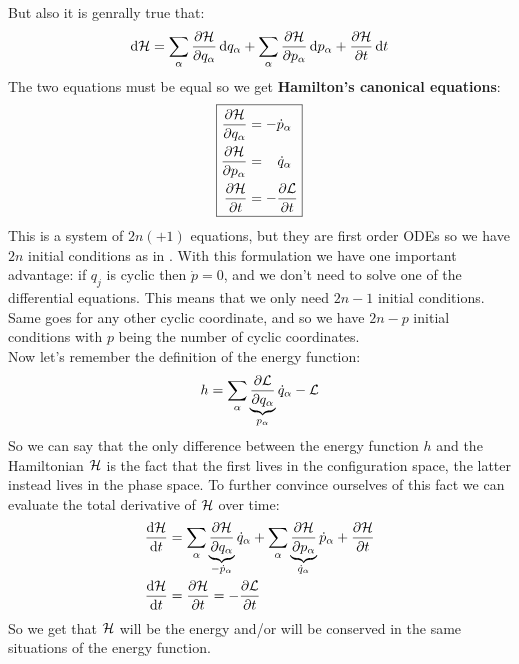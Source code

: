 But also it is genrally true that:
\begin{equation}
    \dd{\hamfun} = \bigsum_{\alpha} \pdv{\hamfun}{q_{\alpha}}\dd{q_{\alpha}} + \bigsum_{\alpha} \pdv{\hamfun}{p_{\alpha}}\dd{p_{\alpha}} + \pdv{\hamfun}{t}\dd{t}
\end{equation}
The two equations must be equal so we get \textbf{Hamilton's canonical equations}:
\begin{equation} \label{hamilton_equations}
    \boxed{
    \begin{aligned}
        \pdv{\hamfun}{q_{\alpha}} &= -\dot{p}_{\alpha}\\
        \pdv{\hamfun}{p_{\alpha}} &=\;\;\;\dot{q}_{\alpha}\\
        \pdv{\hamfun}{t} &= -\pdv{\lagr}{t}
    \end{aligned}}
\end{equation}
This is a system of $2n (+1)$ equations, but they are first order ODEs so we have $2n$ initial conditions as in \lagrangeref. With this formulation we have one important advantage: if $q_j$ is cyclic then $\dot{p} = 0$, and we don't need to solve one of the differential equations.
This means that we only need $2n-1$ initial conditions. Same goes for any other cyclic coordinate, and so we have $2n-p$ initial conditions with $p$ being the number of cyclic coordinates.\\
Now let's remember the definition of the energy function:
\begin{equation}
    h = \bigsum_{\alpha}\underbrace{\pdv{\lagr}{q_{\alpha}}}_{p_{\alpha}}\dot{q}_{\alpha} - \lagr
\end{equation}
So we can say that the only difference between the energy function $h$ and the Hamiltonian $\mathcal{H}$ is the fact that the first lives in the configuration space, the latter instead lives in the phase space.
To further convince ourselves of this fact we can evaluate the total derivative of $\mathcal{H}$ over time:
\begin{equation}
    \begin{split}
        \dv{\hamfun}{t} &= \bigsum_{\alpha}\underbrace{\pdv{\hamfun}{q_{\alpha}}}_{-\dot{p}_{\alpha}}\dot{q}_{\alpha} + \bigsum_{\alpha}\underbrace{\pdv{\hamfun}{p_{\alpha}}}_{\dot{q}_{\alpha}}\dot{p}_{\alpha} + \pdv{\hamfun}{t} \\
        \dv{\hamfun}{t} &= \pdv{\hamfun}{t} = -\pdv{\lagr}{t}
    \end{split}
\end{equation}
So we get that $\mathcal{H}$ will be the energy and/or will be conserved in the same situations of the energy function.
